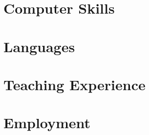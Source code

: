 \section*{Computer Skills}


\section*{Languages}


\section*{Teaching Experience}


\section*{Employment}


\thispagestyle{lastpagestyle}




